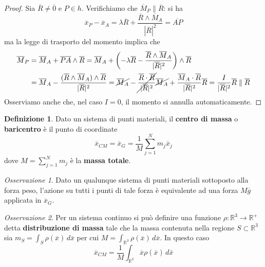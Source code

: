 \documentclass{book}
\theoremstyle{plain}
\theoremstyle{plain}
\theoremstyle{plain}
\theoremstyle{plain}
\theoremstyle{plain}
\theoremstyle{definition}
\newtheorem{defi}{Definizione}[chapter]
\theoremstyle{remark}
\newtheorem*{oss}{Osservazione}
\theoremstyle{definition}
\begin{document}
\begin{proof}
    Sia $\overline{R}\neq\overline{0}$ e $P\in h$. Verifichiamo che $\overline{M}_P\parallel\overline{R}$: si ha
    \begin{displaymath}
        \overline{x}_P-\overline{x}_A=\lambda\overline{R}+\frac{\overline{R}\wedge\overline{M}_A}{|\overline{R}|^2}=\overline{AP}
    \end{displaymath}
    ma la legge di trasporto del momento implica che
    \[
    \begin{split}
        \overline{M}_P&=\overline{M}_A+\overline{PA}\wedge\overline{R}=\overline{M}_A+\left(-\lambda\overline{R}-\frac{\overline{R}\wedge\overline{M}_A}{|\overline{R}|^2}\right)\wedge\overline{R} \\
        &=\overline{M}_A-\frac{(\overline{R}\wedge\overline{M}_A)\wedge\overline{R}}{|\overline{R}|^2}=\cancel{\overline{M}_A}-\cancel{\frac{\overline{R}\cdot\overline{R}}{|\overline{R}|^2}}\cancel{\overline{M}_A}+\frac{\overline{M}_A\cdot\overline{R}}{|\overline{R}|^2}\overline{R}=\frac{I}{|\overline{R}|^2}\overline{R}\parallel\overline{R}
    \end{split}
    \]
    Osserviamo anche che, nel caso $I=0$, il momento si annulla automaticamente.
\end{proof}

\begin{defi}
\everymath{\displaystyle}
    Dato un sistema di punti materiali, il \textbf{centro di massa} o \textbf{baricentro} è il punto di coordinate
    \begin{displaymath}
    \boxed{
        \overline{x}_{CM}=\overline{x}_{G}=\frac{1}{M}\sum_{j=1}^Nm_j\overline{x}_j
        }
    \end{displaymath}
    dove $M=\sum_{j=1}^Nm_j$ è la \textbf{massa totale}.
\end{defi}

\begin{oss}
    Dato un qualunque sistema di punti materiali sottoposto alla forza peso, l'azione su tutti i punti di tale forza è equivalente ad una forza $M\overline{g}$ applicata in $\overline{x}_G$.
\end{oss}

\begin{oss}
    Per un sistema continuo si può definire una funzione $\rho: \mathbb{R}^{3} \to \mathbb{R}^{+}$ detta \textbf{distribuzione di massa} tale che la massa contenuta nella regione $S \subset \mathbb{R}^3$ sia
    $m_{S}=\int_{S} \rho(\overline{x})\,d\overline{x}$ per cui $M=\int_{\mathbb{R}^3}\rho(\overline{x})\,d\overline{x}$. In questo caso
    \begin{displaymath}
        \overline{x}_{CM}=\frac{1}{M} \int_{\mathbb{R}^{3}} \overline{x} \rho(\overline{x})\,d\bar{x}
    \end{displaymath}
\end{oss}
\end{document}
